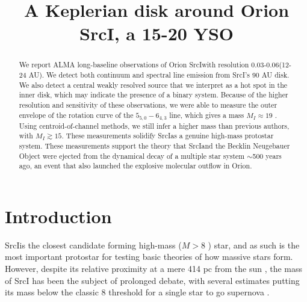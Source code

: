 \documentclass[twocolumn]{aastex61}
\newcommand{\sourcei}{SrcI}
\begin{document}
\title{A Keplerian disk around Orion \sourcei, a 15-20 \msun YSO}
\begin{abstract}
   We report ALMA long-baseline observations of Orion \sourcei with resolution 0.03-0.06\arcsec (12-24 AU).
   We detect both continuum and spectral line emission from \sourcei's 90 AU disk.
   We also detect a central weakly resolved source that we interpret as a hot spot
   in the inner disk, which may indicate the presence of a binary system.
   Because of the higher resolution and sensitivity of these observations, we
   were able to measure the outer envelope of the rotation curve of the \water
   $5_{5,0}-6_{4,3}$ line, which gives a mass $M_I\approx19$ \msun.  Using
   centroid-of-channel methods,
   we still infer a higher mass than previous authors, with
   $M_I\gtrsim15$\msun.
   These measurements solidify \sourcei as a genuine
   high-mass protostar system.
   These measurements support the theory that \sourcei and the Becklin
   Neugebauer Object were ejected from the dynamical decay of a multiple star
   system $\sim$500 years ago, an event that also launched the explosive
   molecular outflow in Orion.
\end{abstract}

\section{Introduction}
\sourcei is the closest candidate forming high-mass ($M>8$ \msun) star, 
and as such is the most important protostar for testing basic theories
of how massive stars form.  However, despite its relative proximity at
a mere 414 pc from the sun \citep{Menten2007a}, the mass of \sourcei
has been the subject of prolonged debate, with several estimates
putting
its mass below the classic 8 \msun threshold for a single star to go supernova
\citep[][]{Heger2003}.
\end{document}
